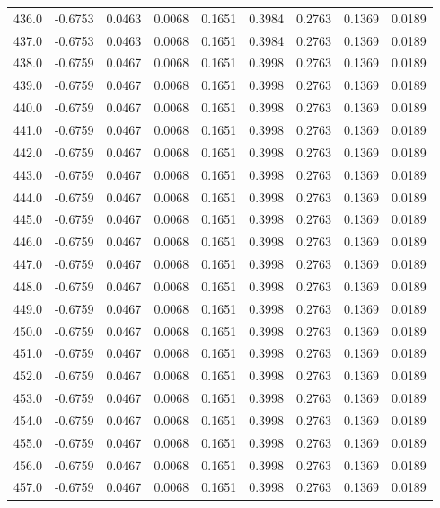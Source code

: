 \begin{longtable}{lrrrrrrrr}
436.0 & -0.6753 & 0.0463 & 0.0068 & 0.1651 & 0.3984 & 0.2763 & 0.1369 & 0.0189 \\
437.0 & -0.6753 & 0.0463 & 0.0068 & 0.1651 & 0.3984 & 0.2763 & 0.1369 & 0.0189 \\
438.0 & -0.6759 & 0.0467 & 0.0068 & 0.1651 & 0.3998 & 0.2763 & 0.1369 & 0.0189 \\
439.0 & -0.6759 & 0.0467 & 0.0068 & 0.1651 & 0.3998 & 0.2763 & 0.1369 & 0.0189 \\
440.0 & -0.6759 & 0.0467 & 0.0068 & 0.1651 & 0.3998 & 0.2763 & 0.1369 & 0.0189 \\
441.0 & -0.6759 & 0.0467 & 0.0068 & 0.1651 & 0.3998 & 0.2763 & 0.1369 & 0.0189 \\
442.0 & -0.6759 & 0.0467 & 0.0068 & 0.1651 & 0.3998 & 0.2763 & 0.1369 & 0.0189 \\
443.0 & -0.6759 & 0.0467 & 0.0068 & 0.1651 & 0.3998 & 0.2763 & 0.1369 & 0.0189 \\
444.0 & -0.6759 & 0.0467 & 0.0068 & 0.1651 & 0.3998 & 0.2763 & 0.1369 & 0.0189 \\
445.0 & -0.6759 & 0.0467 & 0.0068 & 0.1651 & 0.3998 & 0.2763 & 0.1369 & 0.0189 \\
446.0 & -0.6759 & 0.0467 & 0.0068 & 0.1651 & 0.3998 & 0.2763 & 0.1369 & 0.0189 \\
447.0 & -0.6759 & 0.0467 & 0.0068 & 0.1651 & 0.3998 & 0.2763 & 0.1369 & 0.0189 \\
448.0 & -0.6759 & 0.0467 & 0.0068 & 0.1651 & 0.3998 & 0.2763 & 0.1369 & 0.0189 \\
449.0 & -0.6759 & 0.0467 & 0.0068 & 0.1651 & 0.3998 & 0.2763 & 0.1369 & 0.0189 \\
450.0 & -0.6759 & 0.0467 & 0.0068 & 0.1651 & 0.3998 & 0.2763 & 0.1369 & 0.0189 \\
451.0 & -0.6759 & 0.0467 & 0.0068 & 0.1651 & 0.3998 & 0.2763 & 0.1369 & 0.0189 \\
452.0 & -0.6759 & 0.0467 & 0.0068 & 0.1651 & 0.3998 & 0.2763 & 0.1369 & 0.0189 \\
453.0 & -0.6759 & 0.0467 & 0.0068 & 0.1651 & 0.3998 & 0.2763 & 0.1369 & 0.0189 \\
454.0 & -0.6759 & 0.0467 & 0.0068 & 0.1651 & 0.3998 & 0.2763 & 0.1369 & 0.0189 \\
455.0 & -0.6759 & 0.0467 & 0.0068 & 0.1651 & 0.3998 & 0.2763 & 0.1369 & 0.0189 \\
456.0 & -0.6759 & 0.0467 & 0.0068 & 0.1651 & 0.3998 & 0.2763 & 0.1369 & 0.0189 \\
457.0 & -0.6759 & 0.0467 & 0.0068 & 0.1651 & 0.3998 & 0.2763 & 0.1369 & 0.0189 \\

\end{longtable}
